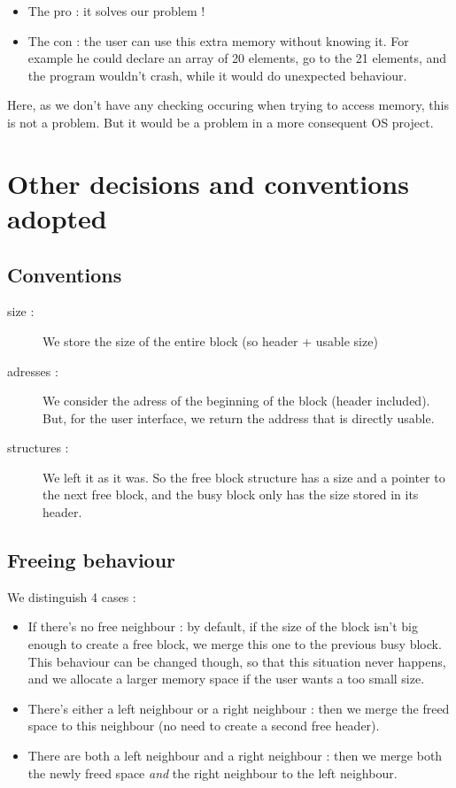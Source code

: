 \documentclass[twoside]{article}
\begin{document}
\begin{itemize}
	\item The pro : it solves our problem !
	\item The con : the user can use this extra memory without knowing it. For 
		example he could declare an array of 20 elements, go to the 21 elements,
		and the program wouldn't crash, while it would do unexpected behaviour.
\end{itemize}

Here, as we don't have any checking occuring when trying to access memory,
this is not a problem. But it would be a problem in a more consequent OS 
project.

\section{Other decisions and conventions adopted}
\subsection{Conventions}
\begin{description}
	\item[size :] We store the size of the entire block (so header + usable 
		size)
	\item[adresses :] We consider the adress of the beginning of the block
		(header included). But, for the user interface, we return the address
		that is directly usable.
	\item[structures :] We left it as it was. So the free block structure has
		a size and a pointer to the next free block, and the busy block only
		has the size stored in its header.
\end{description}

\subsection{Freeing behaviour}
We distinguish 4 cases :
\begin{itemize}
	\item If there's no free neighbour : by default, if the size of the block
		isn't big enough to create a free block, we merge this one to the
		previous busy block. This behaviour can be changed though, so that this
		situation never happens, and we allocate a larger memory space if the
		user wants a too small size.
	\item There's either a left neighbour or a right neighbour : then we merge
		the freed space to this neighbour (no need to create a second free
		header).
	\item There are both a left neighbour and a right neighbour : then we merge
		both the newly freed space \emph{and} the right neighbour to the left
		neighbour.
\end{itemize}
\end{document}
